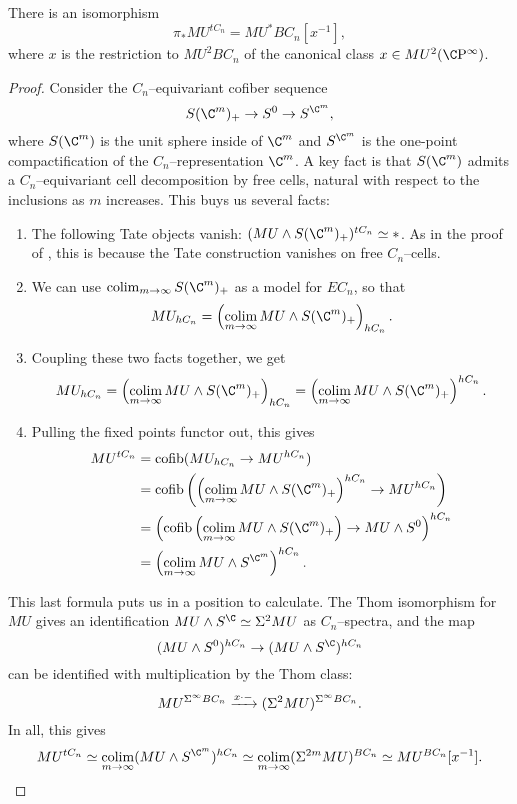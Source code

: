 \begin{theorem}
There is an isomorphism \[\pi_* MU^{tC_n} = MU^* BC_n[x^{-1}],\] where $x$ is the restriction to $MU^2 BC_n$ of the canonical class $x \in MU^2(\CP^\infty)$.
\end{theorem}
\begin{proof}
Consider the $C_n$--equivariant cofiber sequence \[S(\C^m)_+ \to S^0 \to S^{\C^m},\] where $S(\C^m)$ is the unit sphere inside of $\C^m$ and $S^{\C^m}$ is the one-point compactification of the $C_n$--representation $\C^m$.  A key fact is that $S(\C^m)$ admits a $C_n$--equivariant cell decomposition by free cells, natural with respect to the inclusions as $m$ increases.  This buys us several facts:
\begin{enumerate}
    \item The following Tate objects vanish: $(MU \sm S(\C^m)_+)^{tC_n} \simeq *$.  As in the proof of , this is because the Tate construction vanishes on free $C_n$--cells.
    \item We can use $\colim_{m \to \infty} S(\C^m)_+$ as a model for $EC_n$, so that \[MU_{hC_n} = \left( \colim_{m \to \infty} MU \sm S(\C^m)_+ \right)_{hC_n}.\]
    \item Coupling these two facts together, we get \[MU_{hC_n} = \left( \colim_{m \to \infty} MU \sm S(\C^m)_+ \right)_{hC_n} = \left( \colim_{m \to \infty} MU \sm S(\C^m)_+ \right)^{hC_n}.\]
    \item Pulling the fixed points functor out, this gives
    \begin{align*}
    MU^{tC_n} & = \cofib(MU_{hC_n} \to MU^{hC_n}) \\
    & = \cofib\left(\left( \colim_{m \to \infty} MU \sm S(\C^m)_+ \right)^{hC_n} \to MU^{hC_n}\right) \\
    & = \left(\cofib\left( \colim_{m \to \infty} MU \sm S(\C^m)_+ \right) \to MU \sm S^0\right)^{hC_n} \\
    & = \left( \colim_{m \to \infty} MU \sm S^{\C^m} \right)^{hC_n}.
    \end{align*}
\end{enumerate}
This last formula puts us in a position to calculate.  The Thom isomorphism for $MU$ gives an identification $MU \sm S^{\C} \simeq \Susp^2 MU$ as $C_n$--spectra, and the map \[(MU \sm S^0)^{hC_n} \to (MU \sm S^{\C})^{hC_n}\] can be identified with multiplication by the Thom class: \[MU^{\Sigma^\infty BC_n} \xrightarrow{x \cdot -} (\Sigma^2 MU)^{\Sigma^\infty BC_n}.\]  In all, this gives \[MU^{tC_n} \simeq \colim_{m \to \infty} (MU \sm S^{\C^m})^{hC_n} \simeq \colim_{m \to \infty} (\Susp^{2m} MU)^{BC_n} \simeq MU^{BC_n}[x^{-1}]. \qedhere\]
\end{proof}


